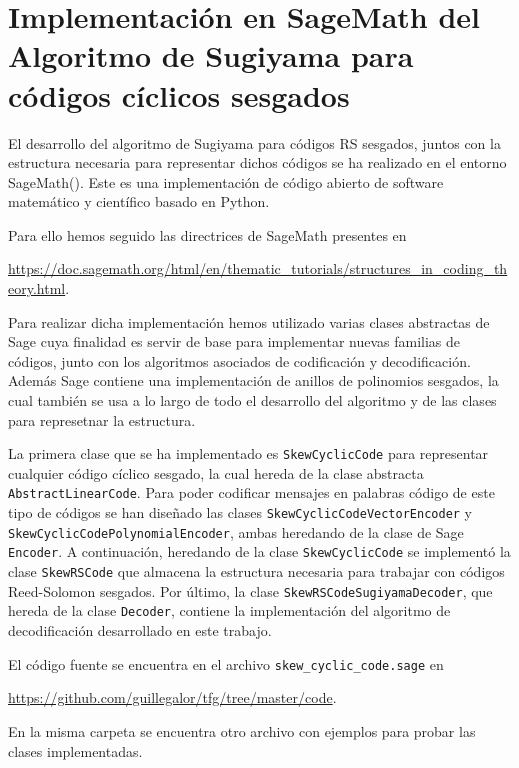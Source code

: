 \chapter{Implementación en SageMath del Algoritmo de Sugiyama para códigos cíclicos sesgados}%
\label{chap:implementación_en_sagemath_del_algoritmo_de_sugiyama_para_códigos_cíclicos_sesgados}

El desarrollo del algoritmo de Sugiyama para códigos RS sesgados, juntos con la estructura necesaria para representar dichos códigos se ha realizado en el entorno SageMath(\cite{sagemath}). Este es una implementación de código abierto de software matemático y científico basado en Python.

Para ello hemos seguido las directrices de SageMath presentes en
\begin{center}
\url{https://doc.sagemath.org/html/en/thematic_tutorials/structures_in_coding_theory.html}.
\end{center}
 Para realizar dicha implementación hemos utilizado varias clases abstractas de Sage cuya finalidad es servir de base para implementar nuevas familias de códigos, junto con los algoritmos asociados de codificación y decodificación. Además Sage contiene una implementación de anillos de polinomios sesgados, la cual también se usa a lo largo de todo el desarrollo del algoritmo y de las clases para represetnar la estructura.

La primera clase que se ha implementado es \texttt{SkewCyclicCode} para representar cualquier código cíclico sesgado, la cual hereda de la clase abstracta \texttt{AbstractLinearCode}. Para poder codificar mensajes en palabras código de este tipo de códigos se han diseñado las clases \texttt{SkewCyclicCodeVectorEncoder} y \texttt{SkewCyclicCodePolynomialEncoder}, ambas heredando de la clase de Sage \texttt{Encoder}. A continuación, heredando de la clase \texttt{SkewCyclicCode} se implementó la clase \texttt{SkewRSCode} que almacena la estructura necesaria para trabajar con códigos Reed-Solomon sesgados. Por último, la clase \texttt{SkewRSCodeSugiyamaDecoder}, que hereda de la clase \texttt{Decoder}, contiene la implementación del algoritmo de decodificación desarrollado en este trabajo.

El código fuente se encuentra en el archivo \texttt{skew\_cyclic\_code.sage} en
\begin{center}
\url{https://github.com/guillegalor/tfg/tree/master/code}.
\end{center}
En la misma carpeta se encuentra otro archivo con ejemplos para probar las clases implementadas.

